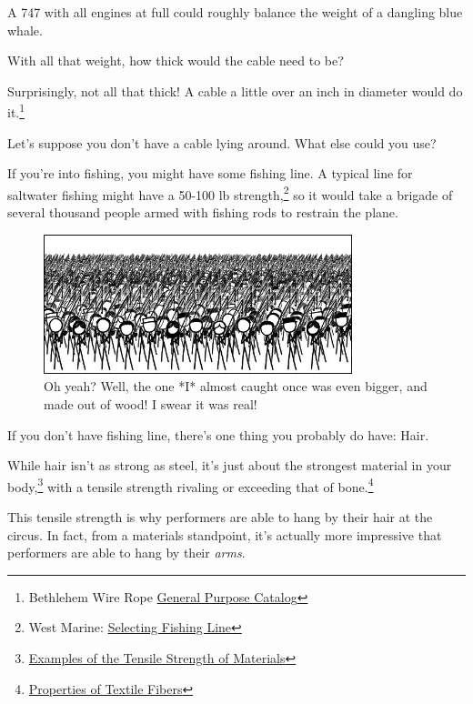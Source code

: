 {{A 747 with all engines at full could roughly balance the weight of a dangling blue whale.}

{With all that weight, how thick would the cable need to be?}

{Surprisingly, not all that thick! A cable a little over an inch in diameter would do it.{\footnote{Bethlehem Wire Rope \href{http://www.wwwrope.com/product\_pdfs/GP\_CAT.pdf}{General Purpose Catalog}} } }

{Let's suppose you don't have a cable lying around. What else could you use?}

{If you're into fishing, you might have some fishing line. A typical line for saltwater fishing might have a 50-100 lb strength,{\footnote{West Marine: \href{http://www.wwwrope.com/product\_pdfs/GP\_CAT.pdf}{Selecting Fishing Line}} } so it would take a brigade of several thousand people armed with fishing rods to restrain the plane.}

\begin{figure}[!htbp]
\centering
\includegraphics[scale=0.5, max width=0.8\textwidth]{imgs/a/56/747_fishing.png}
\caption{Oh yeah? Well, the one *I* almost caught once was even bigger, and made out of wood! I swear it was real!}
\end{figure}

{If you don't have fishing line, there's one thing you probably do have: Hair.}

{While hair isn't as strong as steel, it's just about the strongest material in your body,{\footnote{ \href{http://web2.clarkson.edu/class/me380/materials\_tenstrength.pdf}{Examples of the Tensile Strength of Materials}} } with a tensile strength rivaling or exceeding that of bone.{\footnote{ \href{http://www.academia.edu/2179355/Properties\_of\_Textile\_Fibers} {Properties of Textile Fibers}} } }

{This tensile strength is why performers are able to hang by their hair at the circus. In fact, from a materials standpoint, it's actually more impressive that performers are able to hang by their \emph{arms}.}

}
